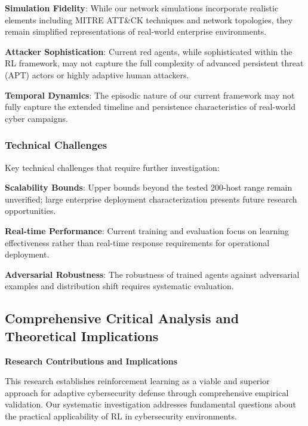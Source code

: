 \documentclass[12pt]{article}
\theoremstyle{definition}
\theoremstyle{plain}
\begin{document}
\textbf{Simulation Fidelity}: While our network simulations incorporate realistic elements including MITRE ATT\&CK techniques and network topologies, they remain simplified representations of real-world enterprise environments.

\textbf{Attacker Sophistication}: Current red agents, while sophisticated within the RL framework, may not capture the full complexity of advanced persistent threat (APT) actors or highly adaptive human attackers.

\textbf{Temporal Dynamics}: The episodic nature of our current framework may not fully capture the extended timeline and persistence characteristics of real-world cyber campaigns.

\subsubsection{Technical Challenges}
Key technical challenges that require further investigation:

\textbf{Scalability Bounds}: Upper bounds beyond the tested 200-host range remain unverified; large enterprise deployment characterization presents future research opportunities.

\textbf{Real-time Performance}: Current training and evaluation focus on learning effectiveness rather than real-time response requirements for operational deployment.

\textbf{Adversarial Robustness}: The robustness of trained agents against adversarial examples and distribution shift requires systematic evaluation.

\subsection{Comprehensive Critical Analysis and Theoretical Implications}

\textbf{Research Contributions and Implications}

This research establishes reinforcement learning as a viable and superior approach for adaptive cybersecurity defense through comprehensive empirical validation. Our systematic investigation addresses fundamental questions about the practical applicability of RL in cybersecurity environments.
\end{document}
